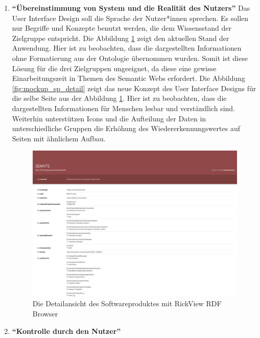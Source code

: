 \begin{enumerate}
\item \textbf{\enquote{\"Ubereinstimmung von System und die Realität des Nutzers}} \newline
Das User Interface Design soll die Sprache der Nutzer*innen sprechen.
Es sollen nur Begriffe und Konzepte benutzt werden, die dem Wissensstand der Zielgruppe entspricht.
Die Abbildung \ref{fig:point2_before} zeigt den aktuellen Stand der Anwendung.
Hier ist zu beobachten, dass die dargestellten Informationen ohne Formatierung aus der Ontologie übernommen wurden.
Somit ist diese Lösung für die drei Zielgruppen ungeeignet, da diese eine gewisse Einarbeitungszeit in Themen des Semantic Webs erfordert.
Die Abbildung \ref{fig:mockup_sp_detail} zeigt das neue Konzept des User Interface Designs für die selbe Seite aus der Abbildung \ref{fig:point2_before}.
Hier ist zu beobachten, dass die dargestellten Informationen für Menschen lesbar und verständlich sind.
Weiterhin unterstützen Icons und die Aufteilung der Daten in unterschiedliche Gruppen die Erhöhung des Wiedererkennungswertes auf Seiten mit ähnlichem Aufbau.

\begin{figure}[ht]
	\centering
    	\includegraphics[width=1.45\textwidth, angle=90]{Images/Punkt_2_davor}
   	\caption[Detailansicht Softwareprodukt]{Die Detailansicht des Softwareproduktes mit RickView RDF Browser}
   	\label{fig:point2_before}
\end{figure}

\clearpage


\item \textbf{\enquote{Kontrolle durch den Nutzer}} \newline


\end{enumerate}
